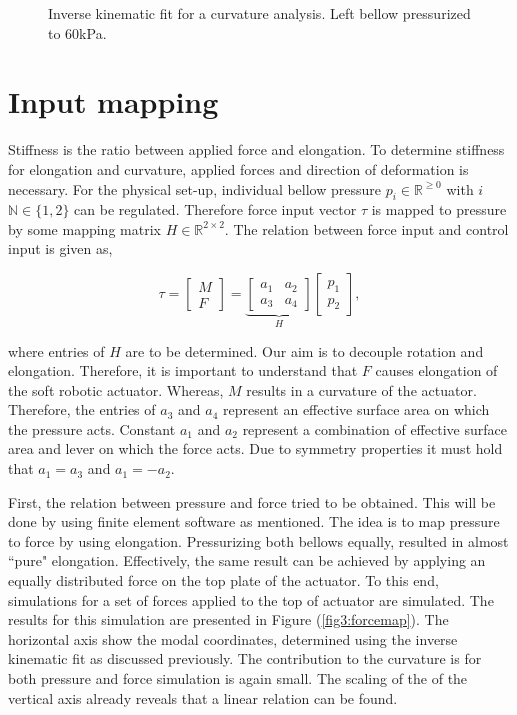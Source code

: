 \begin{figure}[H]
\begin{minipage}{0.5\textwidth}
        \caption{Inverse kinematic fit for a curvature analysis. Left bellow pressurized to 60kPa.}
        \label{fig3:nodalfitcurv}
    \end{minipage}
\end{figure}


\section{Input mapping}
\label{sec3:InputMapping}

Stiffness is the ratio between applied force and elongation. To determine  stiffness for elongation and curvature, applied forces and direction of deformation is necessary. For the physical set-up, individual bellow pressure $p_i \in \mathbb{R}^{\geq 0}$ with $i$ $\mathbb{N} \in \{1,2\}$ can be regulated. Therefore force input vector $\tau$ is mapped to pressure by some mapping matrix $H \in \mathbb{R}^{2 \times 2}$. The relation between force input and control input is given as, 

\begin{equation}
   \tau =   \begin{bmatrix} M \\ F \end{bmatrix}     = \underbrace{\begin{bmatrix}  a_1 & a_2 \\ a_3 & a_4 \end{bmatrix}}_{H}         \begin{bmatrix}  p_1 \\ p_2 \end{bmatrix}, \label{eq3:H}
\end{equation}

where entries of $H$ are to be determined. Our aim is to decouple rotation and elongation. Therefore, it is important to understand that $F$ causes elongation of the soft robotic actuator. Whereas, $M$ results in a curvature of the actuator. Therefore, the entries of $a_3$ and $a_4$ represent an effective surface area on which the pressure acts. Constant $a_1$ and $a_2$ represent a combination of effective surface area and lever on which the force acts. Due to symmetry properties it must hold that $a_1 = a_3$ and $a_1 = -a_2$.

First, the relation between pressure and force tried to be obtained. This will be done by using finite element software as mentioned. The idea is to map pressure to force by using elongation. Pressurizing both bellows equally, resulted in almost ``pure" elongation. Effectively, the same result can be achieved by applying an equally distributed force on the top plate of the actuator. To this end, simulations for a set of forces applied to the top of actuator are simulated. The results for this simulation are presented in Figure (\ref{fig3:forcemap}). The horizontal axis show the modal coordinates, determined using the inverse kinematic fit as discussed previously. The contribution to the curvature is for both pressure and force simulation is again small. The scaling of the of the vertical axis already reveals that a linear relation can be found.


